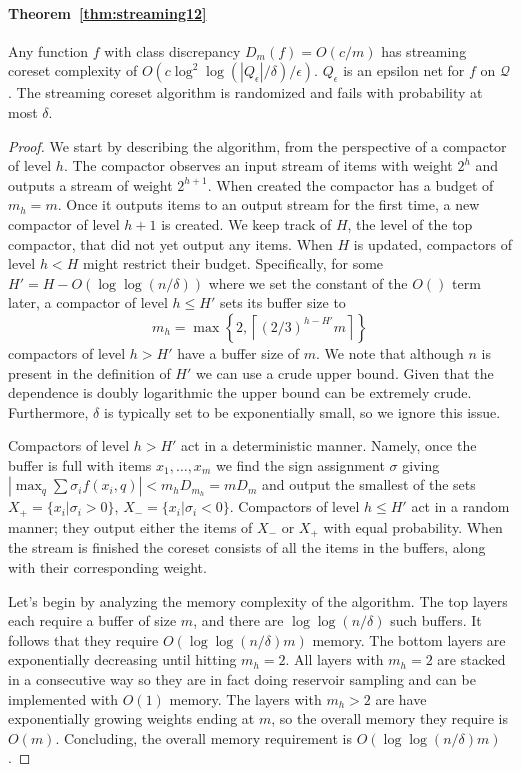 \documentclass[12pt]{colt2019} %
\newcommand{\eps}{\epsilon}
\newcommand{\Q}{\mathcal{Q}}
\newcommand{\ceil}[1]{\left \lceil #1 \right \rceil}
\begin{document}
\paragraph{Theorem~\ref{thm:streaming12}} 
Any function $f$ with class discrepancy $D_m(f) = O(c/m)$ has streaming coreset complexity of $O\left(c\log^2\log(|Q_\eps|/\delta)/\eps\right)$.
$Q_\eps$ is an epsilon net for $f$ on $\Q$. 
The streaming coreset algorithm is randomized and fails with probability at most $\delta$.
\begin{proof}
We start by describing the algorithm, from the perspective of a compactor of level $h$. The compactor observes an input stream of items with weight $2^h$ and outputs a stream of weight $2^{h+1}$. When created the compactor has a budget of $m_h=m$. Once it outputs items to an output stream for the first time, a new compactor of level $h+1$ is created. We keep track of $H$, the level of the top compactor, that did not yet output any items. When $H$ is updated, compactors of level $h<H$ might restrict their budget. Specifically, for some $H'=H-O(\log\log(n/\delta))$ where we set the constant of the $O()$ term later, a compactor of level $h \leq H'$ sets its buffer size to
$$ m_h = \max\left\{2, \ceil{(2/3)^{h-H'}m} \right\} $$
compactors of level $h >H'$ have a buffer size of $m$. We note that although $n$ is present in the definition of $H'$ we can use a crude upper bound. Given that the dependence is doubly logarithmic the upper bound can be extremely crude. Furthermore, $\delta$ is typically set to be exponentially small, so we ignore this issue.

Compactors of level $h >H'$ act in a deterministic manner. Namely, once the buffer is full with items $x_1,\ldots,x_m$ we find the sign assignment $\sigma$ giving $\left|\max_q \sum \sigma_i f(x_i, q)\right| < m_hD_{m_h}=mD_m$ and output the smallest of the sets $X_+=\{x_i | \sigma_i > 0 \}$, $X_- = \{x_i | \sigma_i < 0 \}$. Compactors of level $h \leq H'$ act in a random manner; they output either the items of $X_-$ or $X_+$ with equal probability. When the stream is finished the coreset consists of all the items in the buffers, along with their corresponding weight.

Let's begin by analyzing the memory complexity of the algorithm. The top layers each require a buffer of size $m$, and there are $\log\log(n/\delta)$ such buffers. It follows that they require $O(\log\log(n/\delta)m)$ memory. The bottom layers are exponentially decreasing until hitting $m_h=2$. All layers with $m_h=2$ are stacked in a consecutive way so they are in fact doing reservoir sampling and can be implemented with $O(1)$ memory. The layers with $m_h>2$ are have exponentially growing weights ending at $m$, so the overall memory they require is $O(m)$. Concluding, the overall memory requirement is $O(\log\log(n/\delta)m)$.


\end{proof}
\end{document}
